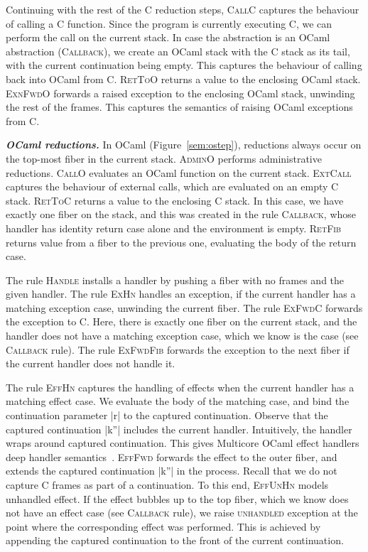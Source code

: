 \documentclass[sigplan,10pt,review,anonymous]{acmart}\settopmatter{printfolios=true,printccs=false,printacmref=false}
\begin{document}
Continuing with the rest of the C reduction steps, \textsc{CallC} captures the
behaviour of calling a C function. Since the program is currently executing C,
we can perform the call on the current stack. In case the abstraction is an
OCaml abstraction (\textsc{Callback}), we create an OCaml stack with the C
stack as its tail, with the current continuation being empty. This captures the
behaviour of calling back into OCaml from C. \textsc{RetToO} returns a value to
the enclosing OCaml stack. \textsc{ExnFwdO} forwards a raised exception to the
enclosing OCaml stack, unwinding the rest of the frames. This captures the
semantics of raising OCaml exceptions from C.

\textbf{\textit{OCaml reductions.}} In OCaml (Figure~\ref{sem:ostep}), reductions
always occur on the top-most fiber in the current stack. \textsc{AdminO}
performs administrative reductions. \textsc{CallO} evaluates an OCaml function
on the current stack. \textsc{ExtCall} captures the behaviour of external
calls, which are evaluated on an empty C stack. \textsc{RetToC} returns a value
to the enclosing C stack. In this case, we have exactly one fiber on the stack,
and this was created in the rule \textsc{Callback}, whose handler has identity
return case alone and the environment is empty. \textsc{RetFib} returns value
from a fiber to the previous one, evaluating the body of the return case.

The rule \textsc{Handle} installs a handler by pushing a fiber with no frames
and the given handler. The rule \textsc{ExHn} handles an exception, if the
current handler has a matching exception case, unwinding the current fiber. The
rule \textsc{ExFwdC} forwards the exception to C. Here, there is exactly one
fiber on the current stack, and the handler does not have a matching exception
case, which we know is the case (see \textsc{Callback} rule). The rule
\textsc{ExFwdFib} forwards the exception to the next fiber if the current
handler does not handle it.

The rule \textsc{EffHn} captures the handling of effects when the current
handler has a matching effect case. We evaluate the body of the matching case,
and bind the continuation parameter |r| to the captured continuation. Observe
that the captured continuation |k''| includes the current handler. Intuitively,
the handler wraps around captured continuation. This gives Multicore OCaml
effect handlers deep handler semantics~\cite{Hillerstrom20}. \textsc{EffFwd} forwards the
effect to the outer fiber, and extends the captured continuation |k''| in the
process. Recall that we do not capture C frames as part of a continuation. To
this end, \textsc{EffUnHn} models unhandled effect. If the effect bubbles up to
the top fiber, which we know does not have an effect case (see
\textsc{Callback} rule), we raise \textsc{unhandled} exception at the point
where the corresponding effect was performed. This is achieved by appending the
captured continuation to the front of the current continuation.
\end{document}
